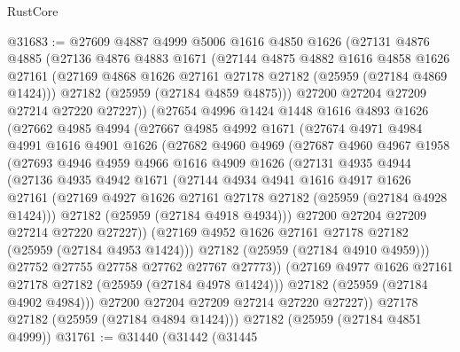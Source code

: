 \begin{lexlean}{RustCore}
\begin{coremodule}
@31683 := @27609
    @4887
    @4999
    @5006
    @1616
    @4850
    @1626
    (@27131
      @4876
      @4885
      (@27136
        @4876
        @4883
        @1671
        (@27144
          @4875
          @4882
          @1616
          @4858
          @1626
          @27161
          (@27169 @4868 @1626 @27161 @27178 @27182 (@25959 (@27184 @4869 @1424)))
          @27182
          (@25959 (@27184 @4859 @4875)))
        @27200
        @27204
        @27209
        @27214
        @27220
        @27227))
    (@27654
      @4996
      @1424
      @1448
      @1616
      @4893
      @1626
      (@27662
        @4985
        @4994
        (@27667
          @4985
          @4992
          @1671
          (@27674
            @4971
            @4984
            @4991
            @1616
            @4901
            @1626
            (@27682
              @4960
              @4969
              (@27687
                @4960
                @4967
                @1958
                (@27693
                  @4946
                  @4959
                  @4966
                  @1616
                  @4909
                  @1626
                  (@27131
                    @4935
                    @4944
                    (@27136
                      @4935
                      @4942
                      @1671
                      (@27144
                        @4934
                        @4941
                        @1616
                        @4917
                        @1626
                        @27161
                        (@27169 @4927 @1626 @27161 @27178 @27182 (@25959 (@27184 @4928 @1424)))
                        @27182
                        (@25959 (@27184 @4918 @4934)))
                      @27200
                      @27204
                      @27209
                      @27214
                      @27220
                      @27227))
                  (@27169 @4952 @1626 @27161 @27178 @27182 (@25959 (@27184 @4953 @1424)))
                  @27182
                  (@25959 (@27184 @4910 @4959)))
                @27752
                @27755
                @27758
                @27762
                @27767
                @27773))
            (@27169 @4977 @1626 @27161 @27178 @27182 (@25959 (@27184 @4978 @1424)))
            @27182
            (@25959 (@27184 @4902 @4984)))
          @27200
          @27204
          @27209
          @27214
          @27220
          @27227))
      @27178
      @27182
      (@25959 (@27184 @4894 @1424)))
    @27182
    (@25959 (@27184 @4851 @4999))
@31761 := @31440
    (@31442
      (@31445

\end{coremodule}
\end{lexlean}
